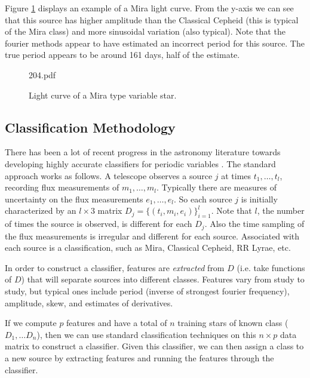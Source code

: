 \documentclass[11pt]{article}
\begin{document}
Figure \ref{fig:mira} displays an example of a Mira light curve. From the y-axis we can see that this source has higher amplitude than the Classical Cepheid (this is typical of the Mira class) and more sinusoidal variation (also typical). Note that the fourier methods appear to have estimated an incorrect period for this source. The true period appears to be around 161 days, half of the estimate.
\begin{figure}[h]
  \begin{center}
    \begin{includegraphics}[scale=.5]{204.pdf}
      \caption{Light curve of a Mira type variable star.\label{fig:mira}}
    \end{includegraphics}
  \end{center}
\end{figure}
\subsection{Classification Methodology}
There has been a lot of recent progress in the astronomy literature towards developing highly accurate classifiers for periodic variables \cite{debosscher2007automated,richards2011machine,dubath2011random}. The standard approach works as follows. A telescope observes a source $j$ at times $t_{1},\ldots,t_{l}$, recording flux measurements of $m_{1},\ldots,m_{l}$. Typically there are measures of uncertainty on the flux measurements $e_{1},\ldots,e_{l}$. So each source $j$ is initially characterized by an $l \times 3$ matrix $D_j=\{(t_{i},m_{i},e_{i})\}_{i=1}^{l}$. Note that $l$, the number of times the source is observed, is different for each $D_j$. Also the time sampling of the flux measurements is irregular and different for each source. Associated with each source is a classification, such as Mira, Classical Cepheid, RR Lyrae, etc.

In order to construct a classifier, features are \textit{extracted} from $D$ (i.e. take functions of $D$) that will separate sources into different classes. Features vary from study to study, but typical ones include period (inverse of strongest fourier frequency), amplitude, skew, and estimates of derivatives.

If we compute $p$ features and have a total of $n$ training stars of known class ($D_1, \ldots D_n$), then we can use standard classification techniques on this $n\times p$ data matrix to construct a classifier. Given this classifier, we can then assign a class to a new source by extracting features and running the features through the classifier.
\end{document}
